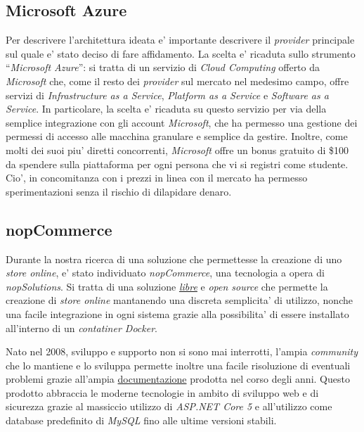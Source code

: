 \documentclass[a4paper]{report}
\newcommand{\quotes}[1]{``#1''}
\begin{document}
		\subsection{Microsoft Azure}\label{microsoft_azure}
			Per descrivere l'architettura ideata e' importante descrivere il \emph{provider} principale sul quale
			e' stato deciso di fare affidamento. La scelta e' ricaduta sullo strumento \quotes{\emph{Microsoft Azure}}:
			si tratta di un servizio di \emph{Cloud Computing} offerto da \emph{Microsoft} che, come il resto dei
			\emph{provider} sul mercato nel medesimo campo, offre servizi di \emph{Infrastructure as a Service},
			\emph{Platform as a Service} e \emph{Software as a Service}.
			In particolare, la scelta e' ricaduta su questo servizio per via della semplice integrazione con gli account
			\emph{Microsoft}, che ha permesso una gestione dei permessi di accesso alle macchina granulare e semplice da
			gestire.
			Inoltre, come molti dei suoi piu' diretti concorrenti, \emph{Microsoft} offre un bonus gratuito di \$100 da
			spendere sulla piattaforma per ogni persona che vi si registri come studente. Cio', in concomitanza con
			i prezzi in linea con il mercato ha permesso sperimentazioni senza il rischio di dilapidare denaro.
		\subsection{nopCommerce}\label{nopcommerce}
			Durante la nostra ricerca di una soluzione che permettesse la creazione di uno \emph{store online}, e' stato
			individuato \emph{nopCommerce}, una tecnologia a opera di \emph{nopSolutions}. Si tratta di una soluzione
			\href{https://github.com/nopSolutions/nopCommerce/blob/develop/LICENSE.md}{\emph{libre}} e \emph{open
			source} che permette la creazione di \emph{store online} mantanendo una discreta semplicita' di utilizzo,
			nonche una facile integrazione in ogni sistema grazie alla possibilita' di essere installato all'interno di
			un \emph{contatiner Docker}.
			
			Nato nel 2008, sviluppo e supporto non si sono mai interrotti, l'ampia \emph{community} che lo mantiene
			e lo sviluppa permette inoltre una facile risoluzione di eventuali problemi grazie all'ampia
			\href{https://docs.nopcommerce.com/en/developer/index.html?utm\_source=github&utm\_medium=referral&utm\_campaign=documentation&utm\_content=text}{documentazione}
			prodotta nel corso degli anni. Questo prodotto abbraccia le moderne tecnologie in ambito di sviluppo web e
			di sicurezza grazie al massiccio utilizzo di \emph{ASP.NET Core 5} e all'utilizzo come database predefinito
			di \emph{MySQL} fino alle ultime versioni stabili. 
\end{document}
